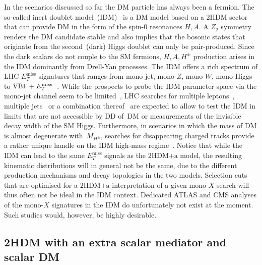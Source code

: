 \documentclass[a4paper, 11pt,notoc]{article}
\newcommand{\MET}{\ensuremath{E_T^\mathrm{miss}}\xspace}
\newcommand{\hdma}{\ensuremath{\textrm{2HDM+a}}\xspace}
\begin{document}
In the scenarios discussed so far the DM particle has always been a fermion. The so-called inert doublet model~(IDM)~\cite{Deshpande:1977rw,Barbieri:2006dq,Cao:2007rm} is a DM model based on a 2HDM sector that can provide DM in the form of the spin-0 resonances $H, A$.  A $Z_2$ symmetry renders the DM candidate stable and also implies  that the bosonic states  that originate from the second~(dark) Higgs doublet can only be pair-produced. Since the dark scalars do not couple to the SM fermions, $H,A,H^\pm$ production arises in the IDM dominantly from Drell-Yan processes. The IDM offers a rich spectrum of LHC $\MET$ signatures that ranges from mono-jet, mono-$Z$, mono-$W$, mono-Higgs to  ${\rm VBF}+\MET$~\cite{Dolle:2009ft,Miao:2010rg,Gustafsson:2012aj,Belanger:2015kga,Ilnicka:2015jba,Poulose:2016lvz,Datta:2016nfz,Hashemi:2016wup,deFlorian:2016spz,Belyaev:2016lok,Dutta:2017lny,Wan:2018eaz}.  While the prospects to probe the IDM parameter space via the mono-jet channel seem to be limited~\cite{Belyaev:2016lok}, LHC searches for multiple leptons~\cite{Dolle:2009ft,Miao:2010rg,Gustafsson:2012aj,Belanger:2015kga,Datta:2016nfz,Hashemi:2016wup}, multiple jets~\cite{Poulose:2016lvz,Dutta:2017lny}  or a combination thereof~\cite{Hashemi:2016wup,Wan:2018eaz} are expected to allow to test the IDM in limits that are not accessible by DD of~DM or measurements of the invisible decay width of the SM Higgs. Furthermore, in scenarios in which the mass of DM is almost degenerate with~$M_{H^\pm}$, searches for disappearing charged tracks provide a rather unique handle on the IDM high-mass regime~\cite{Belyaev:2016lok}. Notice that while the IDM can lead to the same $\MET$ signals  as the \hdma model, the resulting kinematic distributions will in general not be the same, due to the different production mechanisms and decay topologies in the two models. Selection cuts that are optimised for a \hdma interpretation of a given mono-$X$ search will thus often not be ideal in the IDM context. Dedicated ATLAS and CMS  analyses of the mono-$X$ signatures in the IDM do unfortunately not exist at the moment. Such studies would, however, be highly desirable.

\subsection*{2HDM with an extra scalar mediator and scalar DM}
\end{document}
